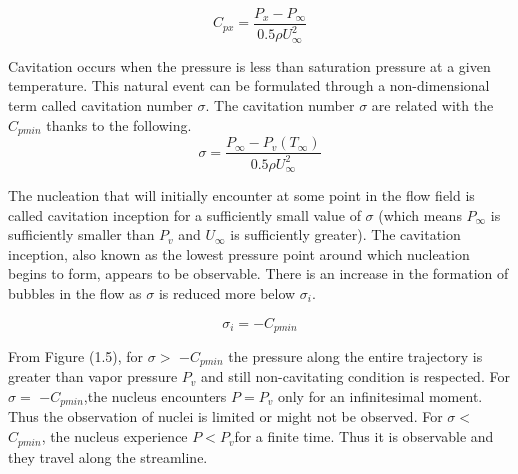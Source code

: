 \begin{equation}
C_{px} =\frac {P_x-P_{\infty}}{{0.5 \rho {U^{2}_{\infty}}}}
\end{equation}

Cavitation occurs when the pressure is less than saturation pressure at a given temperature.
This natural event can be formulated through a non-dimensional term called cavitation number $\sigma$. The cavitation
number $\sigma$ are related with the $C_{pmin}$ thanks to the following.
\begin{equation}
\sigma =\frac{{P_{\infty}}-{{P_v}(T_{\infty})}}{{0.5 \rho {U^{2}_{\infty}}}}
\end{equation}

The nucleation that will initially encounter at some point in the flow field is called cavitation 
inception for a sufficiently small value of $\sigma$ (which means $P_{\infty}$  is sufficiently 
smaller than $P_v$ and $U_{\infty}$ is sufficiently greater).
The cavitation inception, also known as the lowest pressure point around which nucleation begins to form, appears to be observable.
There is an increase in the formation of bubbles in the flow as $\sigma$ is reduced more below $\sigma _{i}$. 

\begin{equation}
{{\sigma}_i} =-C_{pmin}
\end{equation}

From Figure (1.5), for $\sigma >$ $-C_{pmin}$ the pressure along the
entire trajectory is greater than vapor pressure $P_v$ and still
non-cavitating condition is respected. For $\sigma =$ $-C_{pmin}$,the
nucleus encounters $P=P_v$ only for an infinitesimal moment. Thus the observation of nuclei is limited or might not be observed. For $\sigma
<$ $C_{pmin}$, the nucleus experience $P<P_v$for a finite time. Thus  
it is observable and they travel along the streamline.\\


